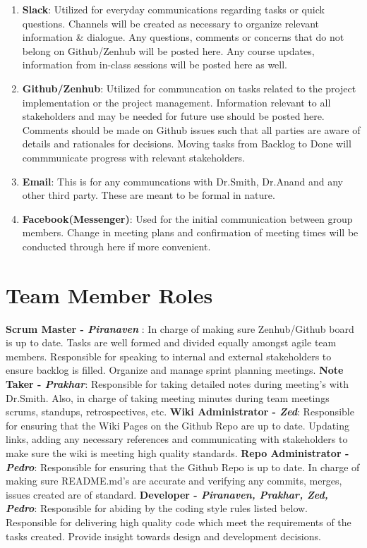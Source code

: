 \documentclass{article}
\begin{document}
\begin{enumerate}
\item \textbf{Slack}: Utilized for everyday communications regarding tasks or quick questions. Channels will be created as necessary to organize relevant information \& dialogue. Any questions, comments or concerns that do not belong on Github/Zenhub will be posted here. Any course updates, information from in-class sessions will be posted here as well.
\item \textbf{Github/Zenhub}: Utilized for communcation on tasks related to the project implementation or the project management. Information relevant to all stakeholders and may be needed for future use should be posted here.  Comments should be made on Github issues such that all parties are aware of details and rationales for decisions. Moving tasks from Backlog to Done will commmunicate progress with relevant stakeholders.
\item \textbf{Email}: This is for any communcations with Dr.Smith, Dr.Anand and any other third party. These are meant to be formal in nature.
\item \textbf{Facebook(Messenger)}: Used for the initial communication between group members. Change in meeting plans and confirmation of meeting times will be conducted through here if more convenient.
\end{enumerate}

\section{Team Member Roles}

\textbf{Scrum Master -\emph{ Piranaven }}: In charge of making sure Zenhub/Github board is up to date. Tasks are well formed and divided equally amongst agile team members. Responsible for  speaking to internal and external stakeholders to ensure backlog is filled. Organize and manage sprint planning meetings. \newline
\textbf{Note Taker - \emph{Prakhar}}: Responsible for taking detailed notes during meeting's with Dr.Smith. Also, in charge of taking meeting minutes during team meetings  scrums, standups, retrospectives, etc. \newline
\textbf{Wiki Administrator - \emph{Zed}}:  Responsible for ensuring that the Wiki Pages on the Github Repo are up to date. Updating links, adding any necessary references and communicating with stakeholders to make sure the wiki is meeting high quality standards.  \newline 
\textbf{Repo Administrator - \emph{ Pedro}}:  Responsible for ensuring that the Github Repo is up to date. In charge of making sure README.md's are accurate and verifying any commits, merges, issues created are of standard.   \newline
\textbf{Developer - \emph{ Piranaven, Prakhar, Zed, Pedro}}: Responsible for abiding by the coding style rules listed below. Responsible for delivering high quality code which meet the requirements of the tasks created. Provide insight towards design and development decisions.  \newline
\end{document}
